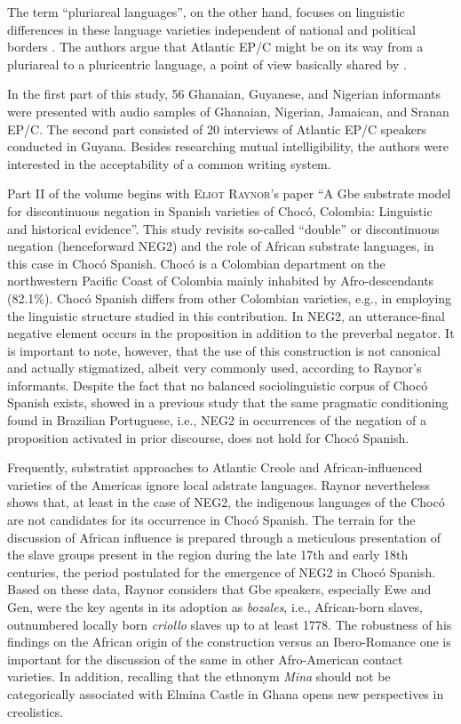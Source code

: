 \documentclass[output=paper,colorlinks,citecolor=brown]{langscibook}
\begin{document}
The term ``pluriareal languages'', on the other hand, focuses on linguistic differences in these language varieties independent of national and political borders \citep{Niehaus_2015,ElspaB_Durscheid_Ziegler_2017}. The authors argue that Atlantic EP/C might be on its way from a pluriareal to a pluricentric language, a point of view basically shared by \citet{Faraclas_2020}.

In the first part of this study, 56 Ghanaian, Guyanese, and Nigerian informants were presented with audio samples of Ghanaian, Nigerian, Jamaican, and Sranan EP/C. The second part consisted of 20 interviews of Atlantic EP/C speakers conducted in Guyana. Besides researching mutual intelligibility, the authors were interested in the acceptability of a common writing system.

Part II of the volume begins with \textsc{Eliot Raynor}'s paper ``A Gbe substrate model for discontinuous negation in Spanish varieties of Chocó, Colombia: Linguistic and historical evidence''. This study revisits so-called ``double'' or discontinuous negation (henceforward NEG2) and the role of African substrate languages, in this case in Choc\'o Spanish. Choc\'o is a Colombian department on the northwestern Pacific Coast of Colombia mainly inhabited by Afro-descendants (82.1\%). Choc\'o Spanish differs from other Colombian varieties, e.g., in employing the linguistic structure studied in this contribution. In NEG2, an utterance-final negative element occurs in the proposition in addition to the preverbal negator. It is important to note, however, that the use of this construction is not canonical and actually stigmatized, albeit very commonly used, according to Raynor's informants. Despite the fact that no balanced sociolinguistic corpus of Choc\'o Spanish exists, \citet{RuizGarcia_2001} showed in a previous study that the same pragmatic conditioning found in Brazilian Portuguese, i.e., NEG2 in occurrences of the negation of a proposition activated in prior discourse, does not hold for Choc\'o Spanish.

Frequently, substratist approaches to Atlantic Creole and African-influenced varieties of the Americas ignore local adstrate languages. Raynor nevertheless shows that, at least in the case of NEG2, the indigenous languages of the Choc\'o are not candidates for its occurrence in Choc\'o Spanish. The terrain for the discussion of African influence is prepared through a meticulous presentation of the slave groups present in the region during the late 17th and early 18th centuries, the period postulated for the emergence of NEG2 in Choc\'o Spanish. Based on these data, Raynor considers that Gbe speakers, especially Ewe and Gen, were the key agents in its adoption as \emph{bozales}, i.e., African-born slaves, outnumbered locally born \emph{criollo} slaves up to at least 1778. The robustness of his findings on the African origin of the construction versus an Ibero-Romance one \citep[cf.][]{Sessarego2017} is important for the discussion of the same in other Afro-American contact varieties. In addition, recalling that the ethnonym \emph{Mina} should not be categorically associated with Elmina Castle in Ghana opens new perspectives in creolistics. 
\end{document}
